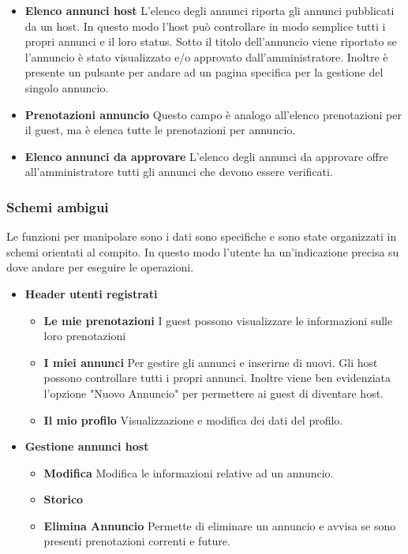 \documentclass[1_relazione.tex]{subfiles}
\begin{document}
\begin{itemize}
\item \textbf{Elenco annunci host}
L'elenco degli annunci riporta gli annunci pubblicati da un host. In questo modo l'host può controllare in modo semplice tutti i propri annunci e il loro status. Sotto il titolo dell'annuncio viene riportato se l'annuncio è stato visualizzato e/o approvato dall'amministratore. Inoltre è presente un pulsante per andare ad un pagina specifica per la gestione del singolo annuncio. 

\item \textbf{Prenotazioni annuncio} Questo campo è analogo all'elenco prenotazioni per il guest, ma è elenca tutte le prenotazioni per annuncio. 

\item \textbf{Elenco annunci da approvare}
L'elenco degli annunci da approvare offre all'amministratore tutti gli annunci che devono essere verificati. 

\end{itemize}

\subsubsection{Schemi ambigui}
Le funzioni per manipolare sono i dati sono specifiche e sono state organizzati in schemi orientati al compito. In questo modo l'utente ha un'indicazione precisa su dove andare per eseguire le operazioni.

\begin{itemize}
\item \textbf{Header utenti registrati}
\begin{itemize}
\item \textbf{Le mie prenotazioni} I guest possono visualizzare le informazioni sulle loro prenotazioni
\item \textbf{I miei annunci} Per gestire gli annunci e inserirne di nuovi. Gli host possono controllare tutti i propri annunci. Inoltre viene ben evidenziata l'opzione "Nuovo Annuncio" per permettere ai guest di diventare host.
\item \textbf{Il mio profilo} Visualizzazione e modifica dei dati del profilo. 
\end{itemize}

\item \textbf{Gestione annunci host}
\begin{itemize}
\item \textbf{Modifica} Modifica le informazioni relative ad un annuncio.
\item \textbf{Storico} 
\item \textbf{Elimina Annuncio} Permette di eliminare un annuncio e avvisa se sono presenti prenotazioni correnti e future.
\end{itemize}
\end{itemize}
\end{document}
